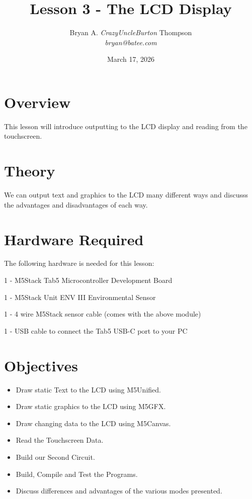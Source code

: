 \documentclass{article}
\title{Lesson 3 - The LCD Display}
\author{Bryan A. \textit{CrazyUncleBurton} Thompson \\ \textit{bryan@batee.com}}
\date{March 17, 2026}
\begin{document}
\maketitle


\section*{Overview}
This lesson will introduce outputting to the LCD display and reading from 
the touchscreen.
\vspace{3mm}


\section*{Theory}
We can output text and graphics to the LCD many different ways and discusss 
the advantages and disadvantages of each way.
\vspace{3mm}


\section*{Hardware Required}

The following hardware is needed for this lesson:

1 - M5Stack Tab5 Microcontroller Development Board

1 - M5Stack Unit ENV III Environmental Sensor

1 - 4 wire M5Stack sensor cable (comes with the above module)

1 - USB cable to connect the Tab5 USB-C port to your PC
\newpage


\section*{Objectives}
\begin{itemize}
  \item Draw static Text to the LCD using M5Unified.
  \item Draw static graphics to the LCD using M5GFX.
  \item Draw changing data to the LCD using M5Canvas.
  \item Read the Touchscreen Data.
  \item Build our Second Circuit.
  \item Build, Compile and Test the Programs.
  \item Discuss differences and advantages of the various modes presented.
\end{itemize}
\vspace{15mm}
\end{document}
